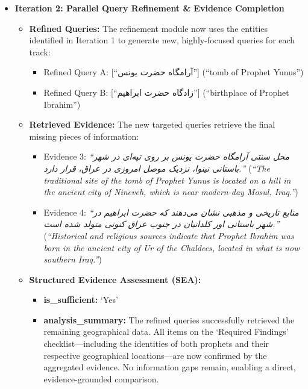 \documentclass[11pt]{article}
\newcommand{\fa}[1]{\textfarsi{#1}}
\begin{document}
\begin{itemize}
\item \textbf{Iteration 2: Parallel Query Refinement \& Evidence Completion}
  \begin{itemize}
  \item \textbf{Refined Queries:} The refinement module now uses the entities identified in Iteration 1 to generate new, highly-focused queries for each track:
    \begin{itemize}
  \item Refined Query A: [``\fa{آرامگاه حضرت یونس}''] (``tomb of Prophet Yunus'')
  \item Refined Query B: [``\fa{زادگاه حضرت ابراهیم}''] (``birthplace of Prophet Ibrahim'')
    \end{itemize}
  \item \textbf{Retrieved Evidence:} The new targeted queries retrieve the final missing pieces of information:
    \begin{itemize}
  \item Evidence 3: \emph{``\fa{محل سنتی آرامگاه حضرت یونس بر روی تپه‌ای در شهر باستانی نینوا، نزدیک موصل امروزی در عراق، قرار دارد.}''} (\emph{``The traditional site of the tomb of Prophet Yunus is located on a hill in the ancient city of Nineveh, which is near modern-day Mosul, Iraq.''})
  \item Evidence 4: \emph{``\fa{منابع تاریخی و مذهبی نشان می‌دهند که حضرت ابراهیم در شهر باستانی اور کلدانیان در جنوب عراق کنونی متولد شده است.}''} (\emph{``Historical and religious sources indicate that Prophet Ibrahim was born in the ancient city of Ur of the Chaldees, located in what is now southern Iraq.''})
    \end{itemize}
  \item \textbf{Structured Evidence Assessment (SEA):}
    \begin{itemize}
    \item \textbf{is\_sufficient:} `Yes'
    \item \textbf{analysis\_summary:} The refined queries successfully retrieved the remaining geographical data. All items on the `Required Findings' checklist---including the identities of both prophets and their respective geographical locations---are now confirmed by the aggregated evidence. No information gaps remain, enabling a direct, evidence-grounded comparison.
    \end{itemize}
  \end{itemize}


\end{itemize}
\end{document}
